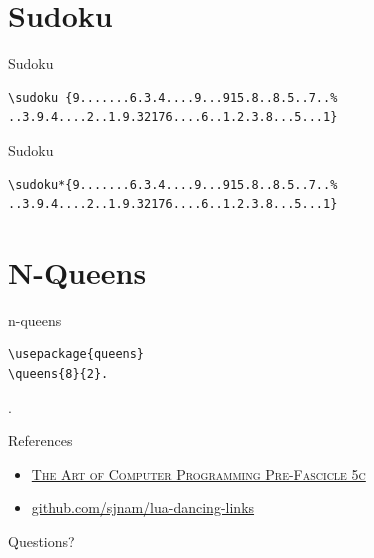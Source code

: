 \documentclass[xcolor=svgnames]{beamer}
\begin{document}
\section{Sudoku}

%
\begin{frame}[fragile]{Sudoku}
\begin{verbatim}
\sudoku {9.......6.3.4....9...915.8..8.5..7..%
..3.9.4....2..1.9.32176....6..1.2.3.8...5...1}
\end{verbatim}  
\begin{center}
\end{center}
\end{frame}

%
\begin{frame}[fragile]{Sudoku}
\begin{verbatim}
\sudoku*{9.......6.3.4....9...915.8..8.5..7..%
..3.9.4....2..1.9.32176....6..1.2.3.8...5...1}
\end{verbatim}
\begin{center}
\end{center}
\end{frame}


\section{N-Queens}

%
\begin{frame}[fragile]{n-queens}
\begin{verbatim}
\usepackage{queens}
\queens{8}{2}.
\end{verbatim}
\vspace{-10mm}
.
\end{frame}


%
\begin{frame}{References}
  \begin{itemize}
  \item \href{http://www-cs-faculty.stanford.edu/~knuth/fasc5c.ps.gz}
    {\textsc{The Art of Computer Programming Pre-Fascicle 5c}}
  \item \href{https://github.com/sjnam/lua-dancing-links}
    {github.com/sjnam/lua-dancing-links}
  \end{itemize}
\end{frame}

%
\begin{frame}[standout]
  Questions?
\end{frame}
\end{document}
